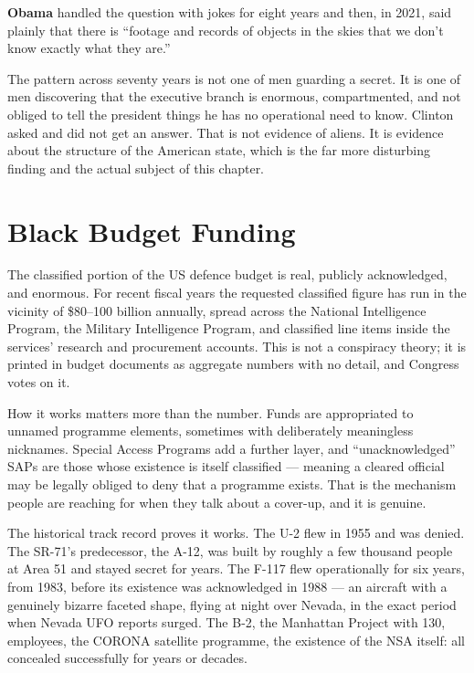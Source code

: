 \textbf{Obama} handled the question with jokes for eight years and then, in 2021, said plainly
that there is ``footage and records of objects in the skies that we don't know exactly what they
are.''

\begin{funfact}
The pattern across seventy years is not one of men guarding a secret. It is one of men
discovering that the executive branch is enormous, compartmented, and not obliged to tell the
president things he has no operational need to know. Clinton asked and did not get an answer.
That is not evidence of aliens. It is evidence about the structure of the American state, which
is the far more disturbing finding and the actual subject of this chapter.
\end{funfact}

\section{Black Budget Funding}\label{sec:blackbudgetfunding}

The classified portion of the US defence budget is real, publicly acknowledged, and enormous.
For recent fiscal years the requested classified figure has run in the vicinity of
\$80--100 billion annually, spread across the National Intelligence Program, the Military
Intelligence Program, and classified line items inside the services' research and procurement
accounts. This is not a conspiracy theory; it is printed in budget documents as aggregate
numbers with no detail, and Congress votes on it.

How it works matters more than the number. Funds are appropriated to unnamed programme
elements, sometimes with deliberately meaningless nicknames.  Special Access Programs
add a further layer, and ``unacknowledged'' SAPs are those whose existence is itself
classified --- meaning a cleared official may be legally obliged to deny that a programme
exists. That is the mechanism people are reaching for when they talk about a cover-up, and it
is genuine.

The historical track record proves it works. The U-2 flew in 1955 and was denied. The
SR-71's predecessor, the A-12, was built by roughly a few thousand people at Area 51 and stayed
secret for years. The F-117 flew operationally for six years, from 1983, before its existence
was acknowledged in 1988 --- an aircraft with a genuinely bizarre faceted shape, flying at
night over Nevada, in the exact period when Nevada UFO reports surged. The B-2, the Manhattan
Project with 130, employees, the CORONA satellite programme, the existence of the NSA
itself: all concealed successfully for years or decades.

